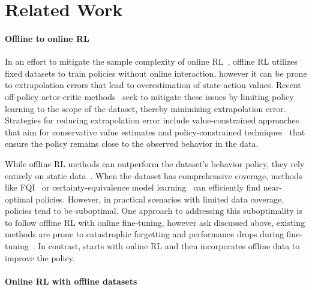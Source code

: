 
\section{Related Work}\label{sec:related}

\paragraph{Offline to online RL}%








In an effort to mitigate the sample complexity of online RL~\citep{liu2023active},
offline RL utilizes fixed datasets to train policies without online interaction, however it can be prone to extrapolation errors that lead to overestimation of state-action values.
Recent off-policy actor-critic methods~\citep{fujimoto2019off, kostrikov2021offline, kumar2020conservative, wang2020critic} seek to mitigate these issues by limiting policy learning to the scope of the dataset, thereby minimizing extrapolation error. 
Strategies for reducing extrapolation error include value-constrained approaches~\citep{kumar2020conservative} that aim for conservative value estimates and policy-constrained techniques~\citep{nair2020awac} that ensure the policy remains close to the observed behavior in the data.

While offline RL methods can outperform the dataset’s behavior policy, they rely entirely on static data~\citep{levine2020offline}. When the dataset has comprehensive coverage, methods like FQI~\citep{antos2007fitted} or certainty-equivalence model learning~\citep{rathnam2023unintended} can efficiently find near-optimal policies. %
However, in practical scenarios with limited data coverage, policies tend to be suboptimal. 
One approach to addressing this suboptimality is to follow offline RL with online fine-tuning, however ask discussed above, existing methods are prone to catastrophic forgetting and performance drops during fine-tuning~\citep{luo2023finetuning}. In contrast, \algname starts with online RL and then incorporates offline data to improve the policy.


\paragraph{Online RL with offline datasets}
\vspace{-0.3cm}


